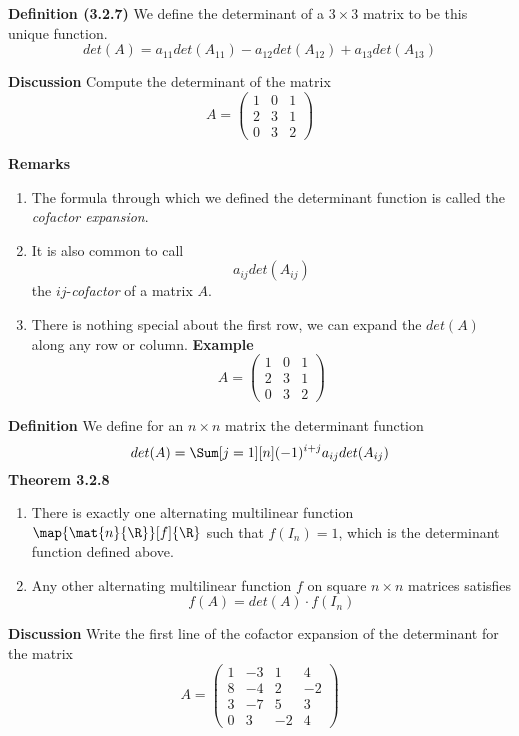 \documentclass[letterpaper, 10pt]{article}
\begin{document}
\lb
\textbf{Definition (3.2.7)}
\lb
We define the determinant of a $3 \times 3$ matrix to be this unique function.
\[ det(A) = a_{11} det(A_{11}) - a_{12} det(A_{12}) + a_{13} det(A_{13}) \]





\vspace{200pt}
\lb
\textbf{Discussion}
\lb
Compute the determinant of the matrix
\[ A = \begin{pmatrix} 1 & 0 & 1 \\ 2 & 3 & 1 \\ 0 & 3 & 2 \end{pmatrix} \]






\newpage
\textbf{Remarks}
\lb
\begin{enumerate}
    \item The formula through which we defined the determinant function
        is called the \emph{cofactor expansion}.
    \item It is also common to call
        \[ a_{ij} det(A_{ij}) \]
        the $ij$-\emph{cofactor} of a matrix $A$.
    \item
        There is nothing special about the first row, we can expand the $det(A)$ along
        any row or column.
        \lb
        \textbf{Example}
        \lb
        \[ A = \begin{pmatrix} 1 & 0 & 1 \\ 2 & 3 & 1 \\ 0 & 3 & 2 \end{pmatrix} \]
\end{enumerate}


\vspace{150pt}
\lb
\textbf{Definition} We define for an $n \times n$ matrix the determinant function
\[ det(A) = \Sum[j=1][n] (-1)^{i + j} a_{ij} det(A_{ij})\]
\lb
\textbf{Theorem 3.2.8}
\lb
\begin{enumerate}
    \item There is exactly one alternating multilinear function $\map{\mat{n}{\R}}[f]{\R}$
        such that $f(I_n) = 1$, which is the determinant function defined above.
    \item Any other alternating multilinear function $f$ on square $n \times n$ matrices
        satisfies
        \[ f(A) = det(A) \cdot f(I_n) \]
\end{enumerate}


\vspace{40pt}
\lb
\textbf{Discussion}
\lb
Write the first line of the cofactor expansion of the determinant for the matrix
\[ A = \begin{pmatrix} 
1 & -3 & 1 & 4 \\ 8 & -4 & 2 & -2 \\ 3 & -7 & 5 & 3 \\ 0 & 3 & -2 & 4 \end{pmatrix} \]
\end{document}
